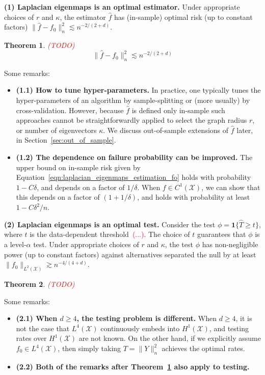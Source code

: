 \documentclass{article}
\newcommand{\1}{\mathbf{1}}
\newcommand{\Leb}{L}
\newcommand{\mc}[1]{\mathcal{#1}}
\newcommand{\wh}[1]{\widehat{#1}}
\theoremstyle{alden}
\theoremstyle{aldenthm}
\newtheorem{theorem}{Theorem}
\theoremstyle{definition}
\theoremstyle{remark}
\begin{document}
\textbf{(1) Laplacian eigenmaps is an optimal estimator.} Under appropriate choices of $r$ and $\kappa$, the estimator $\wh{f}$ has (in-sample) optimal risk (up to constant factors) $\|\wh{f} - f_0\|_n^2 \lesssim n^{-2/(2 + d)}$. 

\begin{theorem}
	\label{thm:laplacian_eigenmaps_estimation_fo}
	\textcolor{red}{(TODO)}
	\begin{equation}
	\label{eqn:laplacian_eigenmaps_estimation_fo}
	\|\wh{f} - f_0\|_n^2 \lesssim n^{-2/(2 + d)}
	\end{equation}
\end{theorem}
Some remarks:
\begin{itemize}
	\item \textbf{(1.1) How to tune hyper-parameters.} In practice, one typically tunes the hyper-parameters of an algorithm by sample-splitting or (more usually) by cross-validation. However, because $\wh{f}$ is defined only in-sample such approaches cannot be straightforwardly applied to select the graph radius $r$, or number of eigenvectors $\kappa$. We discuss out-of-sample extensions of $\wh{f}$ later, in Section~\ref{sec:out_of_sample}.
	\item \textbf{(1.2) The dependence on failure probability can be improved.} The upper bound on in-sample risk given by Equation~\eqref{eqn:laplacian_eigenmaps_estimation_fo} holds with probability $1 - C\delta$, and depends on a factor of $1/\delta$. When $f \in C^1(\mc{X})$, we can show that this depends on a factor of $(1 + 1/\delta)$, and holds with probability at least $1 - C\delta^2/n$. 
\end{itemize}

\textbf{(2) Laplacian eigenmaps is an optimal test.} Consider the test $\phi = \1\{\wh{T} \geq t\}$, where $t$ is the data-dependent threshold~\textcolor{red}{(...)}. The choice of $t$ guarantees that $\phi$ is a level-$\alpha$ test. Under appropriate choices of $r$ and $\kappa$, the test $\phi$ has non-negligible power (up to constant factors) against alternatives separated the null by at least $\|f_0\|_{\Leb^2(\mc{X})} \gtrsim n^{-4/(4 + d)}$. 

\begin{theorem}
	\label{thm:laplacian_eigenmaps_testing_fo}
	\textcolor{red}{(TODO)}
\end{theorem}
Some remarks:
\begin{itemize}
	\item \textbf{(2.1) When $d \geq 4$, the testing problem is different.} When $d \geq 4$, it is not the case that $\Leb^4(\mc{X})$ continuously embeds into $H^1(\mc{X})$, and testing rates over $H^1(\mc{X})$ are not known. On the other hand, if we explicitly assume $f_0 \in \Leb^4(\mc{X})$, then simply taking $T = \|Y\|_n^2$ achieves the optimal rates.
	\item \textbf{(2.2) Both of the remarks after Theorem~\ref{thm:laplacian_eigenmaps_estimation_fo} also apply to testing.}
\end{itemize}
\end{document}
